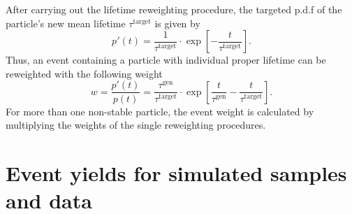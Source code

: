 After carrying out the lifetime reweighting procedure, the targeted p.d.f of the particle's new mean lifetime $\tau^{\text{target}}$ is given by
\begin{equation*}
p'  \left( t \right) = \frac{1}{\tau^{\text{target}}} \cdot \exp\left[ -\frac{t}{\tau^{\text{target}}} \right].
\end{equation*}
Thus, an event containing a particle with individual proper lifetime can be reweighted with the following weight
\begin{equation*}
\label{eq:reweight}
w = \frac{p'  \left( t \right)}{p \left( t \right)} = \frac{\tau^{\text{gen}}}{\tau^{\text{target}}} \cdot \exp\left[ \frac{t}{\tau^{\text{gen}}} - \frac{t}{\tau^{\text{target}}} \right].  %
\end{equation*}
For more than one non-stable particle, the event weight is calculated by multiplying the weights of the single reweighting procedures.

\clearpage
\FloatBarrier
\section{Event yields for simulated samples and data}
\label{app:cutflow}


